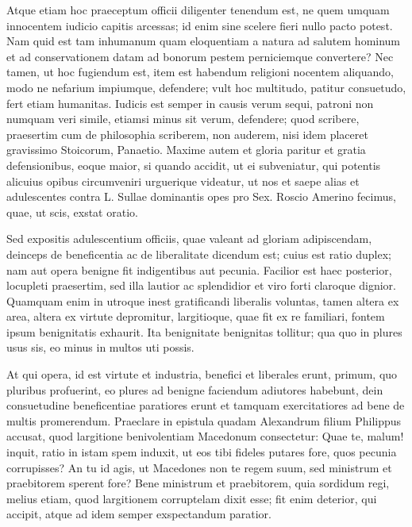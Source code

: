  Atque etiam hoc praeceptum officii diligenter tenendum est, ne quem umquam innocentem iudicio capitis arcessas; id enim sine scelere fieri nullo pacto potest. Nam quid est tam inhumanum quam eloquentiam a natura ad salutem hominum et ad conservationem datam ad bonorum pestem perniciemque convertere? Nec tamen, ut hoc fugiendum est, item est habendum religioni nocentem aliquando, modo ne nefarium impiumque, defendere; vult hoc multitudo, patitur consuetudo, fert etiam humanitas. Iudicis est semper in causis verum sequi, patroni non numquam veri simile, etiamsi minus sit verum, defendere; quod scribere, praesertim cum de philosophia scriberem, non auderem, nisi idem placeret gravissimo Stoicorum, Panaetio. Maxime autem et gloria paritur et gratia defensionibus, eoque maior, si quando accidit, ut ei subveniatur, qui potentis alicuius opibus circumveniri urguerique videatur, ut nos et saepe alias et adulescentes contra L. Sullae dominantis opes pro Sex. Roscio Amerino fecimus, quae, ut scis, exstat oratio.

 Sed expositis adulescentium officiis, quae valeant ad gloriam adipiscendam, deinceps de beneficentia ac de liberalitate dicendum est; cuius est ratio duplex; nam aut opera benigne fit indigentibus aut pecunia. Facilior est haec posterior, locupleti praesertim, sed illa lautior ac splendidior et viro forti claroque dignior. Quamquam enim in utroque inest gratificandi liberalis voluntas, tamen altera ex area, altera ex virtute depromitur, largitioque, quae fit ex re familiari, fontem ipsum benignitatis exhaurit. Ita benignitate benignitas tollitur; qua quo in plures usus sis, eo minus in multos uti possis.

 At qui opera, id est virtute et industria, benefici et liberales erunt, primum, quo pluribus profuerint, eo plures ad benigne faciendum adiutores habebunt, dein consuetudine beneficentiae paratiores erunt et tamquam exercitatiores ad bene de multis promerendum. Praeclare in epistula quadam Alexandrum filium Philippus accusat, quod largitione benivolentiam Macedonum consectetur: Quae te, malum! inquit, ratio in istam spem induxit, ut eos tibi fideles putares fore, quos pecunia corrupisses? An tu id agis, ut Macedones non te regem suum, sed ministrum et praebitorem sperent fore? Bene ministrum et praebitorem, quia sordidum regi, melius etiam, quod largitionem corruptelam dixit esse; fit enim deterior, qui accipit, atque ad idem semper exspectandum paratior.

